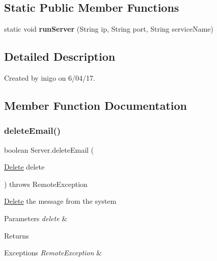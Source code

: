 \subsection*{Static Public Member Functions}
\begin{DoxyCompactItemize}
\item 
\mbox{\label{class_server_af25f1267d05a10696368d856a11328e1}} 
static void {\bfseries run\+Server} (String ip, String port, String service\+Name)
\end{DoxyCompactItemize}


\subsection{Detailed Description}
Created by inigo on 6/04/17. 

\subsection{Member Function Documentation}
\mbox{\label{class_server_ad679fc8c7704690482684e42cc15c740}} 
\subsubsection{\texorpdfstring{delete\+Email()}{deleteEmail()}}
{\footnotesize\ttfamily boolean Server.\+delete\+Email (\begin{DoxyParamCaption}\item[{\hyperlink{class_delete}{Delete}}]{delete }\end{DoxyParamCaption}) throws Remote\+Exception}

\hyperlink{class_delete}{Delete} the message from the system 
\begin{DoxyParams}{Parameters}
{\em delete} & \\
\hline
\end{DoxyParams}
\begin{DoxyReturn}{Returns}

\end{DoxyReturn}

\begin{DoxyExceptions}{Exceptions}
{\em Remote\+Exception} & \\
\hline
\end{DoxyExceptions}


